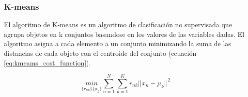 \subsubsection{K-means}

El algoritmo de K-means es un algoritmo de clasificación no supervisada que agrupa objetos en k conjuntos basandose en los valores de las variables dadas. El algoritmo asigna a cada elemento a un conjunto minimizando la suma de las distancias de cada objeto con el centroide del conjunto (ecuación \ref{eq:kmeams_cost_function}).

\begin{equation}
    \underset{\{r_{nk}\}\{\mu_k\}}{min} \sum_{n=1}^N \sum_{k=1}^K r_{nk} ||x_n-\mu_k||^2
    \label{eq:kmeams_cost_function}
\end{equation}